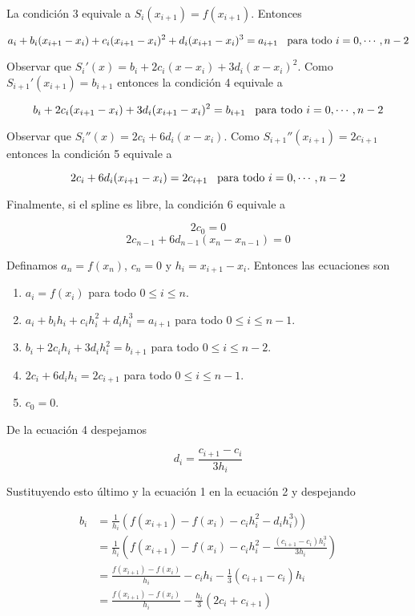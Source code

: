 La condición 3 equivale a $S_i(x_{i + 1}) = f(x_{i + 1})$. Entonces

\[a_i + b_i (x_{i + 1} - x_i) + c_i (x_{i + 1} - x_i)^2 + d_i (x_{i + 1} - x_i)^3 = a_{i + 1} \hspace{0.3cm}\text{para todo } i = 0, \cdots, n - 2\]

Observar que $S_i'(x) = b_i + 2c_i(x - x_i) + 3 d_i (x - x_i)^2$. Como $S_{i + 1}'(x_{i + 1}) = b_{i + 1}$ entonces la condición 4 equivale a 

\[b_i + 2c_i(x_{i + 1} - x_i) + 3 d_i (x_{i + 1} - x_i)^2 = b_{i + 1} \hspace{0.3cm}\text{para todo } i = 0, \cdots, n - 2\]

Observar que $S_i''(x) = 2c_i + 6d_i(x - x_i)$. Como $S_{i + 1}''(x_{i + 1}) = 2c_{i + 1}$ entonces la condición 5 equivale a

\[2c_i + 6d_i(x_{i + 1} - x_i) = 2c_{i + 1} \hspace{0.3cm}\text{para todo } i = 0, \cdots, n - 2\]

Finalmente, si el spline es libre, la condición 6 equivale a

\[2c_0 = 0\]
\[2c_{n - 1} + 6d_{n - 1}(x_n - x_{n - 1}) = 0\]

Definamos $a_n = f(x_n)$, $c_n = 0$ y $h_i = x_{i + 1} - x_i$. Entonces las ecuaciones son

\begin{enumerate}
\item $a_i = f(x_i)$ para todo $0 \leq i \leq n$.
\item $a_i + b_ih_{i} + c_i h_{i}^2 + d_i h_{i}^3 = a_{i + 1}$ para todo $ 0 \leq i \leq n - 1$.
\item $b_i + 2c_i h_{i} + 3d_i h_{i} ^2 = b_{i + 1}$ para todo $0 \leq i \leq n - 2$.
\item $2c_i + 6d_i h_{i} = 2c_{i + 1}$ para todo $ 0 \leq i \leq n - 1$.
\item $c_0 = 0$.
\end{enumerate} 

De la ecuación 4 despejamos

\[d_i = \frac{c_{i + 1} - c_i}{3 h_{i}}\]

Sustituyendo esto último y la ecuación 1 en la ecuación 2 y despejando

\begin{align*}
b_i &= \frac{1}{h_{i}}\left(f(x_{i + 1}) - f(x_i) - c_i h_{i}^2 - d_i h_{i}^3)\right)\\
	&= \frac{1}{h_{i}}\left(f(x_{i + 1}) - f(x_i) - c_i h_{i}^2 - \frac{(c_{i + 1} - c_i) h_{i}^3}{3 h_{i}}\right)\\
	&= \frac{f(x_{i + 1}) - f(x_i)}{h_{i}} - c_i h_{i} - \frac{1}{3} (c_{i + 1} - c_i) h_{i}\\
	&= \frac{f(x_{i + 1}) - f(x_i)}{h_{i}} - \frac{h_{i}}{3}\left(2c_i + c_{i + 1}\right)
\end{align*}

